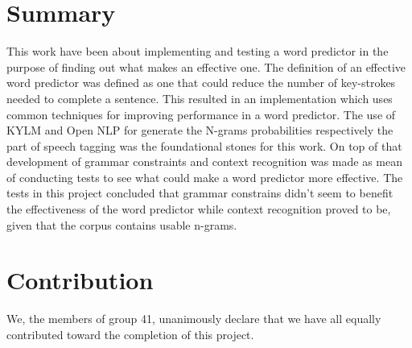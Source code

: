 \section{Summary}
This work have been about implementing and testing a word predictor in the purpose of finding out what makes an effective one. The definition of an effective word predictor was defined as one that could reduce the number of key-strokes needed to complete a sentence. This resulted in an implementation which uses common techniques for improving performance in a word predictor. The use of KYLM and Open NLP for generate the N-grams probabilities respectively the part of speech tagging was the foundational stones for this work. On top of that development of grammar constraints and context recognition was made as mean of conducting tests to see what could make a word predictor more effective. The tests in this project concluded that grammar constrains didn’t seem to benefit the effectiveness of the word predictor while context recognition proved to be, given that the corpus contains usable n-grams.  
\section{Contribution}
We, the members of group 41, unanimously declare that we have all equally contributed toward the completion of this project.